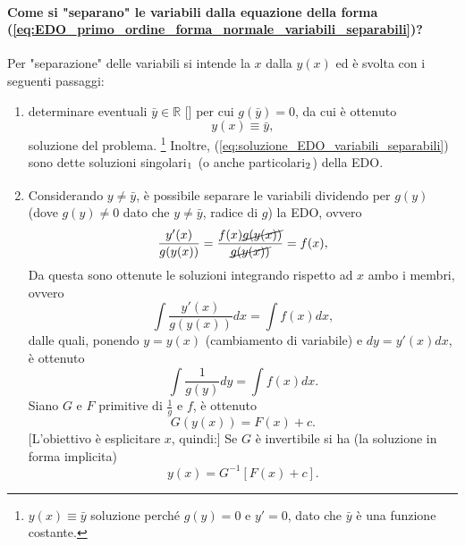 \paragraph{Come si "separano" le variabili dalla equazione della forma (\ref{eq:EDO_primo_ordine_forma_normale_variabili_separabili})?} Per "separazione" delle variabili si intende la $x$ dalla $y(x)$ ed è svolta con i seguenti passaggi:
\begin{enumerate}
    \item determinare eventuali $\bar y\in\mathbb R$ [\footnotemark] per cui $g(\bar y)=0$, da cui è ottenuto
    \begin{equation}\label{eq:soluzione_EDO_variabili_separabili}
        y(x)\equiv \bar y,
    \end{equation}
    soluzione del problema. \footnote{$y(x)\equiv\bar y$ soluzione perché $g(y)=0$ e $y'=0$, dato che $\bar y$ è una funzione costante.} Inoltre, (\ref{eq:soluzione_EDO_variabili_separabili}) sono dette soluzioni singolari$_{\footnotemark}$ (o anche particolari$_{\footnotemark}$) della EDO.
    \item Considerando $y\neq\bar y$, è possibile separare le variabili dividendo per $g(y)$ (dove $g(y)\neq 0$ dato che $y\neq \bar y$, radice di $g$) la EDO, ovvero
    \begin{equation*}
        \frac{y'(x)}{g(y(x))} = \frac{f(x) \cancel{g(y(x))}}{\cancel{g(y(x))}} = f(x),
    \end{equation*}
    Da questa sono ottenute le soluzioni integrando rispetto ad $x$ ambo i membri, ovvero
    \begin{equation*}
        \int\frac{y'(x)}{g(y(x))}dx=\int f(x)dx,
    \end{equation*}
    dalle quali, ponendo $y=y(x)$ (cambiamento di variabile) e $dy = y'(x)dx$, è ottenuto
    \begin{equation*}
        \int \frac{1}{g(y)}dy = \int f(x)dx.
    \end{equation*}
    Siano $G$ e $F$ primitive di $\frac{1}{g}$ e $f$, è ottenuto
    \begin{equation*}
        G(y(x)) = F(x) + c.
    \end{equation*}
    [L'obiettivo è esplicitare $x$, quindi:] Se $G$ è invertibile si ha (la soluzione in forma implicita)
    \begin{equation*}
        y(x) = G^{-1} [F(x) + c].
    \end{equation*}
\end{enumerate}

\addtocounter{footnote}{-2}


